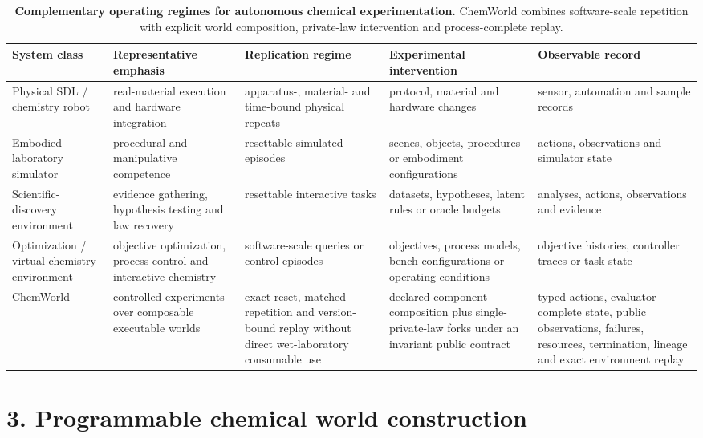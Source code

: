 \documentclass[10pt,twocolumn]{article}
\begin{document}
\begin{table}[!t]
\centering
\small
\caption{\textbf{Complementary operating regimes for autonomous chemical experimentation.} ChemWorld combines software-scale repetition with explicit world composition, private-law intervention and process-complete replay.}
\label{tab:related-position}
\begin{tabularx}{\textwidth}{@{}L{0.18\textwidth}L{0.18\textwidth}L{0.20\textwidth}L{0.20\textwidth}Y@{}}
\toprule
System class & Representative emphasis & Replication regime & Experimental intervention & Observable record \\
\midrule
Physical SDL / chemistry robot & real-material execution and hardware integration & apparatus-, material- and time-bound physical repeats & protocol, material and hardware changes & sensor, automation and sample records \\
Embodied laboratory simulator & procedural and manipulative competence & resettable simulated episodes & scenes, objects, procedures or embodiment configurations & actions, observations and simulator state \\
Scientific-discovery environment & evidence gathering, hypothesis testing and law recovery & resettable interactive tasks & datasets, hypotheses, latent rules or oracle budgets & analyses, actions, observations and evidence \\
Optimization / virtual chemistry environment & objective optimization, process control and interactive chemistry & software-scale queries or control episodes & objectives, process models, bench configurations or operating conditions & objective histories, controller traces or task state \\
ChemWorld & controlled experiments over composable executable worlds & exact reset, matched repetition and version-bound replay without direct wet-laboratory consumable use & declared component composition plus single-private-law forks under an invariant public contract & typed actions, evaluator-complete state, public observations, failures, resources, termination, lineage and exact environment replay \\
\bottomrule
\end{tabularx}
\end{table}

\section{3. Programmable chemical world
construction}\label{programmable-chemical-world-construction}
\end{document}
